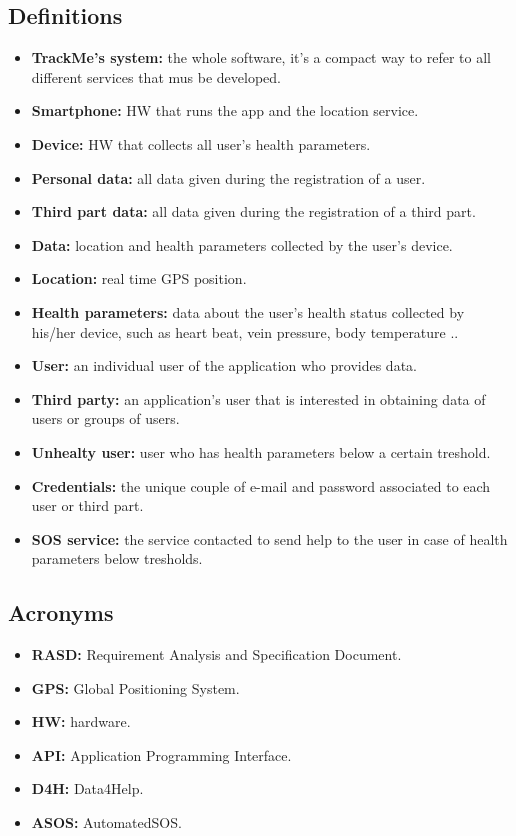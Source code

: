 \subsection{Definitions}
	\begin{itemize}
		\item{\textbf{TrackMe's system:} the whole software, it's a compact way to refer to all different services that mus be 					developed.}

		\item {\textbf{Smartphone:} HW that runs the app and the location service.}
		\item {\textbf{Device:} HW that collects all user's health parameters.}

		\item {\textbf{Personal data:} all data given during the registration of a user.}
		\item {\textbf{Third part data:} all data given during the registration of a third part.}
		\item {\textbf{Data:} location and health parameters collected by the user's device.}
		\item {\textbf{Location:} real time GPS position.}
		\item {\textbf{Health parameters:} data about the user's health status collected by his/her device, such as heart beat, 						vein pressure, body temperature ..}

		\item {\textbf{User:} an individual user of the application who provides data.}
		\item {\textbf{Third party:} an application's user that is interested in obtaining data of users or groups of users.} 
		\item {\textbf{Unhealty user:} user who has health parameters below a certain treshold.}
		\item {\textbf{Credentials:} the unique couple of e-mail and password associated to each user or third part.}

		\item{\textbf{SOS service:} the service contacted to send help to the user in case of health parameters below tresholds.}
	\end {itemize}

\subsection{Acronyms}
	\begin{itemize}
		\item {\textbf {RASD:} Requirement Analysis and Specification Document.}
		\item {\textbf {GPS:} Global Positioning System.}
		\item {\textbf {HW:} hardware.}
		\item {\textbf {API:} Application Programming Interface.}
		\item {\textbf {D4H:} Data4Help.} 
		\item {\textbf {ASOS:} AutomatedSOS.}
	\end{itemize}

